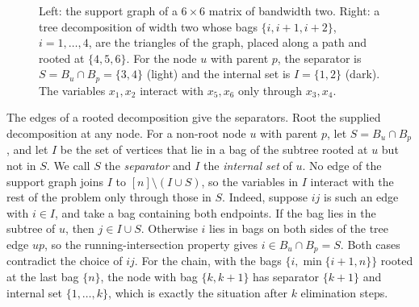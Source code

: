 \begin{figure}[t]
\centering
{}
\caption{Left: the support graph of a $6\times6$ matrix of bandwidth two.
Right: a tree decomposition of width two whose bags $\{i,i+1,i+2\}$,
$i=1,\ldots,4$, are the triangles of the graph, placed along a path and
rooted at $\{4,5,6\}$. For the node $u$ with parent $p$, the separator is
$S=B_u\cap B_p=\{3,4\}$ (light) and the internal set is $I=\{1,2\}$
(dark). The variables $x_1,x_2$ interact with $x_5,x_6$ only through
$x_3,x_4$.}
\label{fig:treedec}
\end{figure}

The edges of a rooted decomposition give the separators. Root the
supplied decomposition at any node. For a non-root node $u$ with parent
$p$, let $S=B_u\cap B_p$, and let $I$ be the set of vertices that lie in
a bag of the subtree rooted at $u$ but not in $S$. We call $S$ the
\emph{separator} and $I$ the \emph{internal set} of $u$. No edge of the
support graph joins $I$ to $[n]\setminus(I\cup S)$, so the variables in
$I$ interact with the rest of the problem only through those in $S$.
Indeed, suppose $ij$ is such an edge with $i\in I$, and take a bag
containing both endpoints. If the bag lies in the subtree of $u$, then
$j\in I\cup S$. Otherwise $i$ lies in bags on both sides of the tree edge
$up$, so the running-intersection property gives $i\in B_u\cap B_p=S$.
Both cases contradict the choice of $ij$. For the chain, with the bags
$\{i,\min\{i+1,n\}\}$ rooted at the last bag $\{n\}$, the node with bag
$\{k,k+1\}$ has separator $\{k+1\}$ and internal set $\{1,\ldots,k\}$,
which is exactly the situation after $k$ elimination steps.

